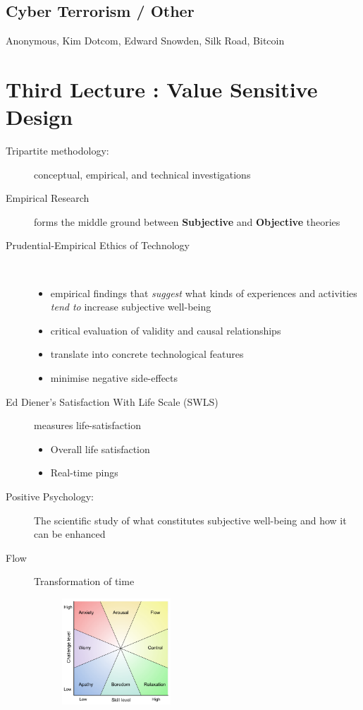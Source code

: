 \documentclass[a4paper]{article}
\begin{document}
\subsection*{Cyber Terrorism / Other}

Anonymous, Kim Dotcom, Edward Snowden, Silk Road, Bitcoin

\section{Third Lecture : Value Sensitive Design}

\begin{description}
\item[Tripartite methodology:] conceptual, empirical, and technical investigations
\item[Empirical Research] forms the middle ground between \textbf{Subjective} and \textbf{Objective} theories
\item[Prudential-Empirical Ethics of Technology]~
\begin{itemize}
\item empirical findings that \textit{suggest} what kinds of experiences and activities \textit{tend to} increase subjective well-being
\item critical evaluation of validity and causal relationships
\item translate into concrete technological features
\item minimise negative side-effects
\end{itemize}
\item[Ed Diener's Satisfaction With Life Scale (SWLS)] measures life-satisfaction
\begin{itemize}
\item Overall life satisfaction
\item Real-time pings
\end{itemize}
\item[Positive Psychology:] The scientific study of what constitutes subjective well-being and how it can be enhanced
\item[Flow] Transformation of time
\begin{figure}[H]
\centering
\includegraphics[width=0.4\textwidth]{pictures/Flow}

\end{figure}
\end{description}
\end{document}
